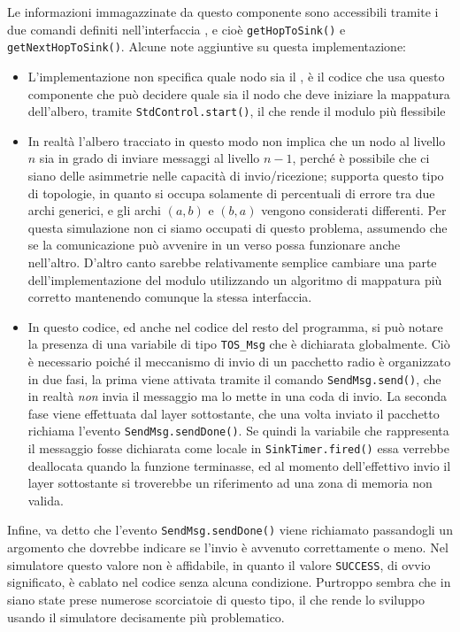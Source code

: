 \documentclass[twoside,11pt,a4paper,italian,openany]{book}
\begin{document}
Le informazioni immagazzinate da questo componente sono accessibili tramite i due comandi 
definiti nell'interfaccia \treedata, e cioè \texttt{getHopToSink()} e \texttt{getNextHopToSink()}. 
Alcune note aggiuntive su questa implementazione:
\begin{itemize}
\item{L'implementazione non specifica quale nodo sia il \sink, è il codice che usa questo 
componente che può decidere quale sia il nodo che deve iniziare la mappatura dell'albero, 
tramite \texttt{StdControl.start()}, il che rende il modulo più flessibile}

\item{In realtà l'albero tracciato in questo modo non implica che un nodo al livello $n$ sia in 
grado di inviare messaggi al livello $n-1$, perché è possibile che ci siano delle asimmetrie 
nelle capacità di invio/ricezione; \tos supporta questo tipo di topologie, in quanto si 
occupa solamente di percentuali di errore tra due archi generici, e gli archi $(a,b)$ e $(b,a)$ 
vengono considerati differenti. Per questa simulazione non ci siamo occupati di questo problema,
assumendo che se la comunicazione può avvenire in un verso possa funzionare anche nell'altro. 
D'altro canto sarebbe relativamente semplice cambiare una parte dell'implementazione del modulo \tree utilizzando un algoritmo di mappatura più corretto mantenendo comunque la stessa 
interfaccia.}

\item{In questo codice, ed anche nel codice del resto del programma, si può notare la presenza 
di una variabile di tipo \texttt{TOS\_Msg} che è dichiarata globalmente.
Ciò è necessario poiché il meccanismo di invio di un pacchetto radio è organizzato in due fasi, 
la prima viene attivata tramite il comando \texttt{SendMsg.send()}, che in realtà \emph{non} 
invia il messaggio ma lo mette in una coda di invio.
La seconda fase viene effettuata dal layer sottostante, che una volta inviato il pacchetto 
richiama l'evento \texttt{SendMsg.sendDone()}. 
Se quindi la variabile che rappresenta il messaggio fosse dichiarata come locale in 
\texttt{SinkTimer.fired()} essa verrebbe deallocata quando la funzione terminasse,  
ed al momento dell'effettivo invio il layer sottostante si troverebbe un riferimento 
ad una zona di memoria non valida. }
\end{itemize}

Infine, va detto che l'evento \texttt{SendMsg.sendDone()} viene richiamato passandogli un 
argomento che  dovrebbe indicare se l'invio è avvenuto correttamente o meno. 
Nel simulatore questo valore non è affidabile, in quanto il valore \texttt{SUCCESS}, di ovvio 
significato, è cablato nel codice senza alcuna condizione. 
Purtroppo sembra che in \tos siano state prese numerose scorciatoie di questo tipo, il che 
rende lo sviluppo usando il simulatore decisamente più problematico. 
\end{document}
